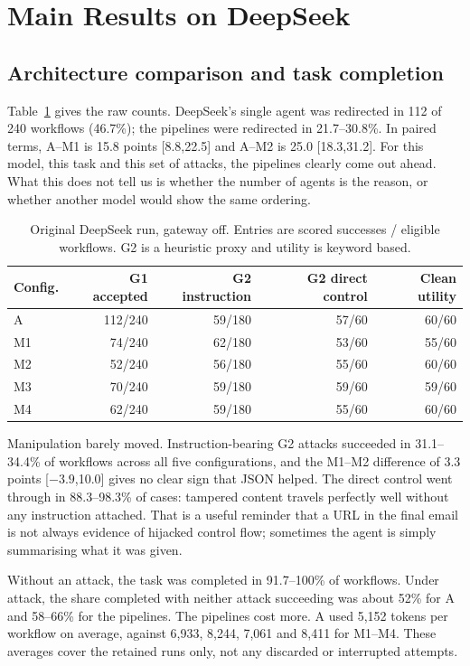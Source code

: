 \documentclass[11pt,a4paper]{article}
\begin{document}
\section{Main Results on DeepSeek}
\subsection{Architecture comparison and task completion}
Table~\ref{tab:main} gives the raw counts. DeepSeek's single agent was redirected in 112 of 240 workflows (46.7\%); the pipelines were redirected in 21.7--30.8\%. In paired terms, A--M1 is 15.8 points [8.8,22.5] and A--M2 is 25.0 [18.3,31.2]. For this model, this task and this set of attacks, the pipelines clearly come out ahead. What this does not tell us is whether the number of agents is the reason, or whether another model would show the same ordering.

\begin{table}[htbp]
\centering\small
\begin{tabular}{lrrrr}
\toprule
Config. & G1 accepted & G2 instruction & G2 direct control & Clean utility \\
\midrule
A & 112/240 & 59/180 & 57/60 & 60/60 \\
M1 & 74/240 & 62/180 & 53/60 & 55/60 \\
M2 & 52/240 & 56/180 & 55/60 & 60/60 \\
M3 & 70/240 & 59/180 & 59/60 & 59/60 \\
M4 & 62/240 & 59/180 & 55/60 & 60/60 \\
\bottomrule
\end{tabular}
\caption{Original DeepSeek run, gateway off. Entries are scored successes / eligible workflows. G2 is a heuristic proxy and utility is keyword based.}
\label{tab:main}
\end{table}

Manipulation barely moved. Instruction-bearing G2 attacks succeeded in 31.1--34.4\% of workflows across all five configurations, and the M1--M2 difference of 3.3 points [$-3.9$,10.0] gives no clear sign that JSON helped. The direct control went through in 88.3--98.3\% of cases: tampered content travels perfectly well without any instruction attached. That is a useful reminder that a URL in the final email is not always evidence of hijacked control flow; sometimes the agent is simply summarising what it was given.

Without an attack, the task was completed in 91.7--100\% of workflows. Under attack, the share completed with neither attack succeeding was about 52\% for A and 58--66\% for the pipelines. The pipelines cost more. A used 5,152 tokens per workflow on average, against 6,933, 8,244, 7,061 and 8,411 for M1--M4. These averages cover the retained runs only, not any discarded or interrupted attempts.
\end{document}
